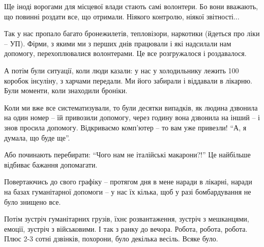 Ще іноді ворогами для місцевої влади стають самі волонтери. Бо вони вважають,
що повинні роздати все, що отримали. Ніякого контролю, ніякої звітності... 

Так у нас пропало багато бронежилетів, тепловізори, наркотики (йдеться про ліки
– УП). Фірми, з якими ми з перших днів працювали і які надсилали нам допомогу,
перехоплювалися волонтерами. Це все розгружалося і роздавалося.

А потім були ситуації, коли люди казали: у нас у холодильнику лежить 100
коробок інсуліну, з харчами передали. Ми його забирали і віддавали в лікарню.
Були моменти, коли знаходили броніки.

Коли ми вже все систематизували, то були десятки випадків, як людина дзвонила
на один номер – їй привозили допомогу, через годину вона дзвонила на інший – і
знов просила допомогу. Відкриваємо комп'ютер – то вам уже привезли! \enquote{А, я
думала, що буде ще}.

Або починають перебирати: \enquote{Чого нам не італійські макарони?!} Це найбільше
відбиває бажання допомагати.

Повертаючись до свого графіку – протягом дня в мене наради в лікарні, наради на
базах гуманітарної допомоги – у нас їх кілька, щоб у разі бомбардування не було
знищено все. 

Потім зустріч гуманітарних грузів, їхнє розвантаження, зустріч з мешканцями,
емоції, зустріч з військовими. І так з ранку до вечора. Робота, робота, робота.
Плюс 2-3 сотні дзвінків, похорони, було декілька весіль. Всяке було. 
